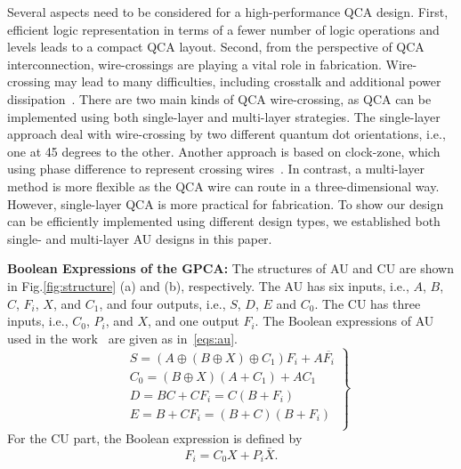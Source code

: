 \documentclass[9pt,journal,compsoc]{IEEEtran}
\begin{document}
Several aspects need to be considered for a high-performance QCA design.
First, efficient logic representation in terms of a fewer number of logic operations and levels leads to a compact QCA layout.
Second, from the perspective of QCA interconnection, wire-crossings are playing a vital role in fabrication.
Wire-crossing may lead to many difficulties, including crosstalk and additional power dissipation~\cite{nath2017optimal}.
There are two main kinds of QCA wire-crossing, as QCA can be implemented using both single-layer and multi-layer strategies. 
The single-layer approach deal with wire-crossing by two different quantum dot orientations, i.e., one at 45 degrees to the other. Another approach is based on clock-zone, which using phase difference to represent crossing wires~\cite{shin2013wire}.
In contrast, a multi-layer method is more flexible as the QCA wire can route in a three-dimensional way.
However, single-layer QCA is more practical for fabrication.
To show our design can be efficiently implemented using different design types, we established both single- and multi-layer AU designs in this paper.
  
\textbf{Boolean Expressions of the GPCA:}
The structures of AU and CU are shown in Fig.\ref{fig:structure} (a) and (b), respectively.
The AU has six inputs, i.e., $A$, $B$, $C$, $F_{i}$, $X$, and $C_{1}$, and four outputs, i.e., $S$, $D$, $E$ and $C_{0}$.
The CU has three inputs, i.e., $C_{0}$, $P_{i}$, and $X$, and one output $F_{i}$.
The Boolean expressions of AU used in the work~\cite{4} are given as in~\eqref{eqs:au}.
\begin{equation}~\label{eqs:au}
\left.
\begin{split}
& S =(A \oplus (B \oplus X) \oplus C_{1}) F_{i} + A\overline{F_{i}} \\
&C_{0} = (B \oplus X)(A + C_{1}) + AC_{1} \\
&D =BC + CF_{i} = C (B + F_{i})\\    
&E =  B + CF_{i} = (B+C)(B+F_{i})\\
\end{split}\right\}
\end{equation}
For the CU part, the Boolean expression is defined by
\begin{equation}\label{eq:cu}
F_{i} = C_{0}X + P_{i}\bar{X}.
\end{equation}
\end{document}
